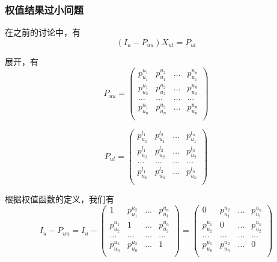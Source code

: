 \documentclass[notheorems, UTF8]{beamer}
\theoremstyle{plain}
\begin{document}
\begin{frame}
\frametitle{权值结果过小问题}
在之前的讨论中，有
\begin{displaymath}
(I_u - P_{uu})X_{ul} = P_{ul}
\end{displaymath}

展开，有
\begin{displaymath}
P_{uu} = \left(
\begin{array}{cccc}
p_{u_1}^{u_1} & p_{u_1}^{u_2} & \ldots & p_{u_1}^{u_n}  \\
p_{u_2}^{u_1} & p_{u_2}^{u_2} & \ldots & p_{u_2}^{u_n}  \\
\ldots & \ldots & \ldots & \ldots \\
p_{u_n}^{u_1} & p_{u_n}^{u_2} & \ldots & p_{u_n}^{u_n}  \\
\end{array}
\right)
\end{displaymath}

\begin{displaymath}
P_{ul} = \left(
\begin{array}{cccc}
p_{u_1}^{l_1} & p_{u_1}^{l_2} & \ldots & p_{u_1}^{l_n}  \\
p_{u_2}^{l_1} & p_{u_2}^{l_2} & \ldots & p_{u_2}^{l_n}  \\
\ldots & \ldots & \ldots & \ldots \\
p_{u_n}^{l_1} & p_{u_n}^{l_2} & \ldots & p_{u_n}^{l_n}  \\
\end{array}
\right)
\end{displaymath}

根据权值函数的定义，我们有
\begin{displaymath}
I_u - P_{uu} = I_u - \left(
\begin{array}{cccc}
1 & p_{u_1}^{u_2} & \ldots & p_{u_1}^{u_n}  \\
p_{u_2}^{u_1} & 1 & \ldots & p_{u_2}^{u_n}  \\
\ldots & \ldots & \ldots & \ldots \\
p_{u_n}^{u_1} & p_{u_n}^{u_2} & \ldots & 1  \\
\end{array}
\right) = \left(
\begin{array}{cccc}
0 & p_{u_1}^{u_2} & \ldots & p_{u_1}^{u_n}  \\
p_{u_2}^{u_1} & 0 & \ldots & p_{u_2}^{u_n}  \\
\ldots & \ldots & \ldots & \ldots \\
p_{u_n}^{u_1} & p_{u_n}^{u_2} & \ldots & 0  \\
\end{array}
\right)
\end{displaymath}
\end{frame}
\end{document}
